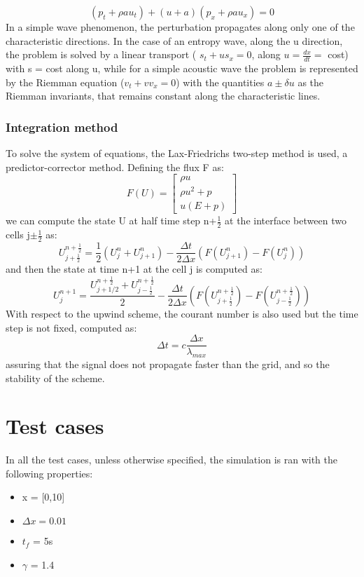 \documentclass{report}
\begin{document}
\begin{equation*}
    (p_t + \rho a u_t) + (u + a) (p_x + \rho a u_x) = 0
\end{equation*}
In a simple wave phenomenon, the perturbation propagates along only one of the characteristic directions.
In the case of an entropy wave, along the u direction, the problem is solved by a linear transport ( $ s_t + u s_x = 0$, along $u = \frac{dx}{dt} =$ cost) with s = cost along u, while
for a simple acoustic wave the problem is represented by the Riemman equation ($v_t + v v_x = 0$) with 
the quantities $ a \pm \delta u$ as the Riemman invariants, that remains constant along the characteristic lines.\\

\subsubsection{Integration method}
To solve the system of equations, the Lax-Friedrichs two-step method is used, a predictor-corrector method.
Defining the flux F as:
\begin{equation*}
    F(U) = \begin{bmatrix}
        \rho u \\
        \rho u^2 + p \\
        u (E + p)
    \end{bmatrix}
\end{equation*}
we can compute the state U at half time step n+$\frac{1}{2}$ at the interface between two cells j$\pm\frac{1}{2}$ as:
\begin{equation*}
    U^{n+\frac{1}{2}}_{j+\frac{1}{2}} = \frac{1}{2} (U^n_j + U^n_{j+1}) - \frac{\Delta t}{2\Delta x} (F(U^n_{j+1}) - F(U^n_j))
\end{equation*}
and then the state at time n+1 at the cell j is computed as:
\begin{equation*}
    U^{n+1}_j = \frac{U_{j+1/2}^{n+\frac{1}{2}} + U_{j-\frac{1}{2}}^{n+\frac{1}{2}}}{2} - \frac{\Delta t}{2\Delta x} (F(U_{j+\frac{1}{2}}^{n+\frac{1}{2}}) - F(U_{j-\frac{1}{2}}^{n+\frac{1}{2}}))
\end{equation*}
With respect to the upwind scheme, the courant number is also used but the time step is not fixed, computed as:
\begin{equation*}
    \Delta t = c \frac{\Delta x}{\lambda_{max}}
\end{equation*}
assuring that the signal does not propagate faster than the grid, and so the stability of the scheme.
\section*{Test cases}
In all the test cases, unless otherwise specified, the simulation is ran with the following properties:
\begin{itemize}[label={}]
    \item x = [0,10]
    \item $\Delta x = 0.01$
    \item $t_f$ = 5s
    \item $\gamma$ = 1.4
\end{itemize}
\end{document}
